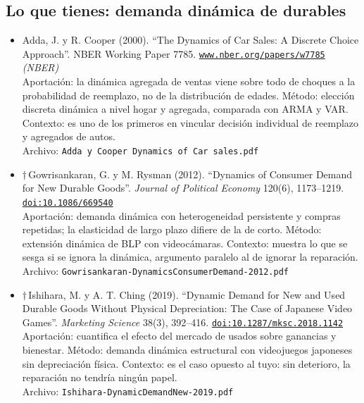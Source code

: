\documentclass[11pt]{article}
\begin{document}
\subsection*{Lo que tienes: demanda dinámica de durables}
\begin{itemize}
\item Adda, J. y R. Cooper (2000). ``The Dynamics of Car Sales: A Discrete Choice Approach''. NBER Working Paper 7785. \href{https://www.nber.org/papers/w7785}{\texttt{www.nber.org/papers/w7785}} \textit{(NBER)}\\
Aportación: la dinámica agregada de ventas viene sobre todo de choques a la probabilidad de reemplazo, no de la distribución de edades. Método: elección discreta dinámica a nivel hogar y agregada, comparada con ARMA y VAR. Contexto: es uno de los primeros en vincular decisión individual de reemplazo y agregados de autos.\\
{\footnotesize Archivo: \texttt{Adda y Cooper Dynamics of Car sales.pdf}}
\item $\dagger$\,Gowrisankaran, G. y M. Rysman (2012). ``Dynamics of Consumer Demand for New Durable Goods''. \textit{Journal of Political Economy} 120(6), 1173--1219. \href{https://doi.org/10.1086/669540}{\texttt{doi:10.1086/669540}}\\
Aportación: demanda dinámica con heterogeneidad persistente y compras repetidas; la elasticidad de largo plazo difiere de la de corto. Método: extensión dinámica de BLP con videocámaras. Contexto: muestra lo que se sesga si se ignora la dinámica, argumento paralelo al de ignorar la reparación.\\
{\footnotesize Archivo: \texttt{Gowrisankaran-DynamicsConsumerDemand-2012.pdf}}
\item $\dagger$\,Ishihara, M. y A. T. Ching (2019). ``Dynamic Demand for New and Used Durable Goods Without Physical Depreciation: The Case of Japanese Video Games''. \textit{Marketing Science} 38(3), 392--416. \href{https://doi.org/10.1287/mksc.2018.1142}{\texttt{doi:10.1287/mksc.2018.1142}}\\
Aportación: cuantifica el efecto del mercado de usados sobre ganancias y bienestar. Método: demanda dinámica estructural con videojuegos japoneses sin depreciación física. Contexto: es el caso opuesto al tuyo: sin deterioro, la reparación no tendría ningún papel.\\
{\footnotesize Archivo: \texttt{Ishihara-DynamicDemandNew-2019.pdf}}
\end{itemize}
\end{document}
